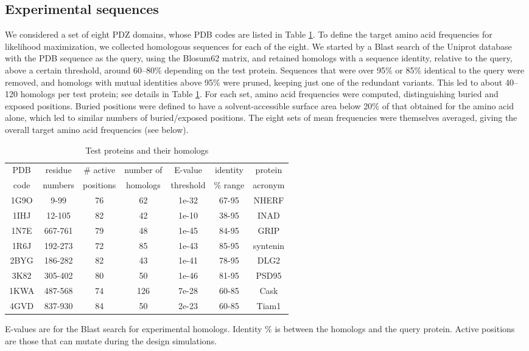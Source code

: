 \documentclass[12pt]{article}
\begin{document}
\subsection{Experimental sequences}
We considered a set of eight PDZ domains, whose PDB codes are listed in Table \ref{tab:PDZ}. To define the target amino
acid frequencies for likelihood maximization, we collected homologous sequences for each of the eight. We started by a Blast
search of the Uniprot database with the PDB sequence as the query, using the Blosum62 matrix, and retained homologs with a
sequence identity, relative to the query, above a certain threshold, around 60--80\% depending on the test protein. 
Sequences that were over 95\% or 85\% identical to the query were removed, and homologs with mutual identities above 95\%
were pruned, keeping just one of the redundant variants. This led to about 40--120 homologs per test protein; see details
in Table \ref{tab:PDZ}. For each set, amino acid frequencies were computed, distinguishing buried and exposed positions.
Buried positions were defined to have a solvent-accessible surface area below 20\% of that obtained for the amino acid alone,
which led to similar numbers of buried/exposed positions. The eight sets of mean frequencies were themselves averaged, giving
the overall target amino acid frequencies (see below).
\begin{table}[h]                            
\caption{Test proteins and their homologs} \label{tab:PDZ}                      
\begin{center} 
\begin{tabular}{ccccccc} \hline \hline  
PDB  & residue & \# active & number of & E-value   & identity & protein \\
code & numbers & positions & homologs  & threshold & \% range & acronym \\ \hline
1G9O & 9-99    & 76        & 62        & 1e-32     & 67-95    & NHERF   \\
1IHJ & 12-105  & 82        & 42        & 1e-10     & 38-95    & INAD    \\
1N7E & 667-761 & 79        & 48        & 1e-45     & 84-95    & GRIP    \\
1R6J & 192-273 & 72        & 85        & 1e-43     & 85-95    & syntenin \\
2BYG & 186-282 & 82        & 43        & 1e-41     & 78-95    & DLG2    \\
3K82 & 305-402 & 80        & 50        & 1e-46     & 81-95    & PSD95   \\
1KWA & 487-568 & 74        & 126       & 7e-28     & 60-85    & Cask    \\
4GVD & 837-930 & 84        & 50        & 2e-23     & 60-85    & Tiam1   \\ \hline
\end{tabular}
\end{center}
{\small \noindent E-values are for the Blast search for experimental homologs. Identity \% is between the
homologs and the query protein. Active positions are those that can mutate during the design simulations.
}
\end{table}
\end{document}

